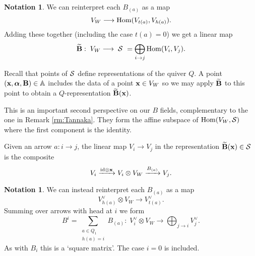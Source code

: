 \documentclass{amsart}
\newcommand{\balpha}{\boldsymbol{\alpha}}
\theoremstyle{definition}
\newtheorem{notn}[theorem]{Notation}
\newcommand\VW{V_W}
\begin{document}
\begin{notn}
We can reinterpret each $B_{(a)}$ as a map
$$ \VW \longrightarrow \Hom( V_{t(a)},  V_{h(a)}). $$
Adding these together (including the case $t(a)=0$) we get a linear map
$$\widetilde{\bfB} :\; \VW \longrightarrow\; \cS \,\,=\bigoplus_{i\to j} \Hom(V_i, V_j).$$
\end{notn}

Recall that points of $\mathcal{S}$ define representations of the quiver $Q$.  A point $(\bfx, \balpha, \bfB) \in \bA$ includes the data of a point $\bfx\in \VW$ so we may apply $\widetilde{\mathbf{B}}$ to this point to obtain a $Q$-representation $\widetilde{\mathbf{B}}(\mathbf{x})$. 

This is an important second perspective on our $B$ fields, complementary to the one in Remark \ref{rm:Tannaka}. They form the affine subspace of $\Hom(\VW, \cS)$ where the first component is the identity.

 


Given an arrow $a:i\to j$, the linear map $V_i \rightarrow V_j$ in the representation $\widetilde{\mathbf{B}}(\mathbf{x}) \in \mathcal{S}$ is the composite
\begin{equation}\label{eq:Btilde}
 V_i \xrightarrow{\textup{id} \otimes \bfx} V_i \otimes \VW \xrightarrow{B_{(a)}} V_j.
\end{equation}

\begin{notn}\label{notn:B^i}
We can instead reinterpret each $B_{(a)}$ as a map
$$ V_{h(a)}^\vee\otimes \VW \longrightarrow V_{t(a)}^\vee. $$
Summing over arrows with head at $i$ we form
 $$B^{i} = \sum_{\substack{a\in Q_1 \\ h(a)=i}} B_{(a)} \colon\; V_i^\vee \otimes \VW \longrightarrow \bigoplus_{j\to i} V_j^\vee.$$
As with $B_i$ this is a `square matrix'. The case $i=0$ is included. 
\end{notn}
\end{document}
